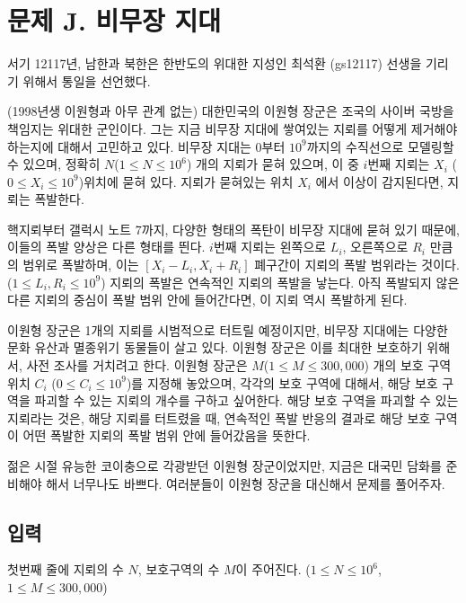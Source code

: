 \documentclass{article}
\begin{document}
\section{문제 J. 비무장 지대}
서기 12117년, 남한과 북한은 한반도의 위대한 지성인 최석환 (gs12117) 선생을 기리기 위해서 통일을 선언했다.\newline

(1998년생 이원형과 아무 관계 없는) 대한민국의 이원형 장군은 조국의 사이버 국방을 책임지는 위대한 군인이다. 그는 지금 비무장 지대에 쌓여있는 지뢰를 어떻게 제거해야 하는지에 대해서 고민하고 있다. 비무장 지대는 0부터 $10^9$까지의 수직선으로 모델링할 수 있으며, 정확히 $N$($1 \leq N \leq 10^6$) 개의 지뢰가 묻혀 있으며, 이 중 $i$번째 지뢰는 $X_i$ ($0 \leq X_i \leq 10^9$)위치에 묻혀 있다. 지뢰가 묻혀있는 위치 $X_i$ 에서 이상이 감지된다면, 지뢰는 폭발한다. \newline

핵지뢰부터 갤럭시 노트 7까지, 다양한 형태의 폭탄이 비무장 지대에 묻혀 있기 때문에, 이들의 폭발 양상은 다른 형태를 띈다. $i$번째 지뢰는 왼쪽으로 $L_i$, 오른쪽으로 $R_i$ 만큼의 범위로 폭발하며, 이는 $[X_i - L_i, X_i + R_i]$ 폐구간이 지뢰의 폭발 범위라는 것이다. ($1 \leq L_i, R_i \leq 10^9$) 지뢰의 폭발은 연속적인 지뢰의 폭발을 낳는다. 아직 폭발되지 않은 다른 지뢰의 중심이 폭발 범위 안에 들어간다면, 이 지뢰 역시 폭발하게 된다. \newline

이원형 장군은 1개의 지뢰를 시범적으로 터트릴 예정이지만, 비무장 지대에는 다양한 문화 유산과 멸종위기 동물들이 살고 있다. 이원형 장군은 이를 최대한 보호하기 위해서, 사전 조사를 거치려고 한다. 이원형 장군은 $M$($1 \leq M \leq 300,000$) 개의 보호 구역 위치 $C_i$ ($0 \leq C_i \leq 10^9$)를 지정해 놓았으며, 각각의 보호 구역에 대해서, 해당 보호 구역을 파괴할 수 있는 지뢰의 개수를 구하고 싶어한다. 해당 보호 구역을 파괴할 수 있는 지뢰라는 것은, 해당 지뢰를 터트렸을 때, 연속적인 폭발 반응의 결과로 해당 보호 구역이 어떤 폭발한 지뢰의 폭발 범위 안에 들어갔음을 뜻한다. \newline

젊은 시절 유능한 코이충으로 각광받던 이원형 장군이었지만, 지금은 대국민 담화를 준비해야 해서 너무나도 바쁘다. 여러분들이 이원형 장군을 대신해서 문제를 풀어주자.

\subsection{입력}
첫번째 줄에 지뢰의 수 $N$, 보호구역의 수 $M$이 주어진다. ($1 \leq N \leq 10^6$, $1 \leq M \leq 300,000$) \newline
\end{document}
